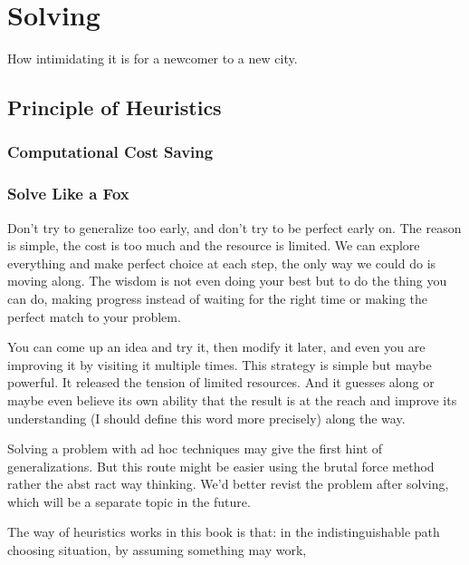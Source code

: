 \chapter{Solving}




How intimidating it is for a newcomer to a new city.

\section{Principle of Heuristics}
\subsection{Computational Cost Saving}




\subsection{Solve Like a Fox}
Don't try to generalize too early, and don't try to be perfect early on. The reason is simple, the cost is too much and the resource is limited. We can explore everything and make perfect choice at each step, the only way we could do is moving along. The wisdom is not even doing your best but to do the thing you can do, making progress instead of waiting for the right time or making the perfect match to your problem.

You can come up an idea and try it, then modify it later, and even you are improving it by visiting it multiple times. This strategy is simple but maybe powerful. It released the tension of limited resources. And it guesses along or maybe even believe its own ability that the result is at the reach and improve its understanding (I should define this word more precisely) along the way.

Solving a problem with ad hoc techniques may give the first hint of generalizations. But this route might be easier using the brutal force method rather the abst ract way thinking. We'd better revist the problem after solving, which will be a separate topic in the future.

The way of heuristics works in this book is that: in the indistinguishable path choosing situation, by assuming something may work,


